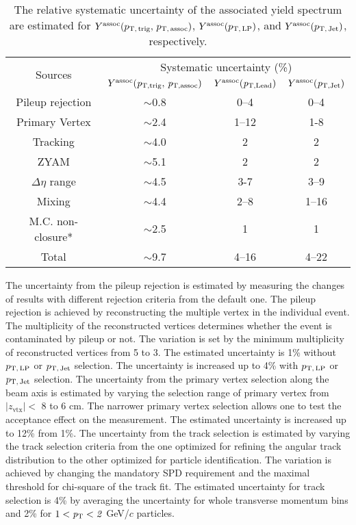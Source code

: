 \begin{table}[h!]
\caption{The relative systematic uncertainty of the associated yield spectrum are estimated for $Y^{\rm{assoc}}(p_\mathrm{T,\,trig},\,p_\mathrm{T,\,assoc})$, $Y^{\rm{assoc}}(p_\mathrm{T,\,LP})$, and $Y^{\rm{assoc}}(p_\mathrm{T,\,Jet})$, respectively.}
\centering
\begin{tabular}{|c|c|c|c|}
\hline 
\multirow{2}{*}{Sources}  & \multicolumn{3}{c|}{Systematic uncertainty (\%)} \\\cline{2-4}
         & $Y^{\rm{assoc}}(\it{p}_{\rm{T, trig}},\,\it{p}_{\rm{T, assoc}})$ & $Y^{\rm{assoc}}(\it{p}_{\rm{T, Lead}})$ & $Y^{\rm{assoc}}(\it{p}_{\rm{T, Jet}})$ \\ \hline \hline
Pileup rejection		& $\sim$0.8	&0--4		&0--4		\\ \hline
Primary Vertex		& $\sim$2.4	&1--12	&1-8		\\ \hline

Tracking			& $\sim$4.0 	&2		&2		\\ \hline

ZYAM			& $\sim$5.1	&2		&2		\\ \hline
$\Delta\eta$ range	& $\sim$4.5	&3-7		&3--9		\\ \hline

Mixing			& $\sim$4.4	&2--8		&1--16	\\ \hline

M.C. non-closure*	& $\sim$2.5 	&1		&1		\\ \hline
Total 			& $\sim$9.7	&4--16	&4--22	\\ 
\hline 
\end{tabular}
\label{tab:syst}
\end{table}

The uncertainty from the pileup rejection is estimated by measuring the changes of results with different rejection criteria from the default one. The pileup rejection is achieved by reconstructing the multiple vertex in the individual event. The multiplicity of the reconstructed vertices determines whether the event is contaminated by pileup or not. The variation is set by the minimum multiplicity of reconstructed vertices from 5 to 3. 
The estimated uncertainty is 1\% without $p_\mathrm{T,\,LP}$ or $p_\mathrm{T,\,Jet}$ selection. The uncertainty is increased up to 4\% with $p_\mathrm{T,\,LP}$ or $p_\mathrm{T,\,Jet}$ selection. The uncertainty from the primary vertex selection along the beam axis is estimated by varying the selection range of primary vertex from $|z_\mathrm{vtx}|<$ 8 to 6 cm. The narrower primary vertex selection allows one to test the acceptance effect on the measurement. The estimated uncertainty is increased up to 12\% from 1\%.
The uncertainty from the track selection is estimated by varying the track selection criteria from the one optimized for refining the angular track distribution to the other optimized for particle identification. The variation is achieved by changing the mandatory SPD requirement and the maximal threshold for chi-square of the track fit.
The estimated uncertainty for track selection is 4\% by averaging the uncertainty for whole transverse momentum bins and 2\% for $1<\it{p}_{\rm{T}}<2$ GeV/$c$ particles.

